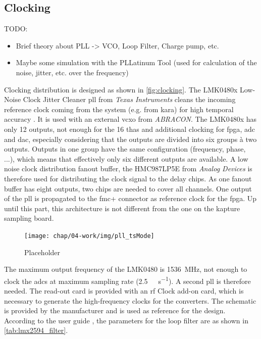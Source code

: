 \subsection{Clocking}
TODO:
\begin{itemize}
	\item Brief theory about PLL -> VCO, Loop Filter, Charge pump, etc.
	\item Maybe some simulation with the PLLatinum Tool (used for calculation of the noise, jitter, etc. over the frequency)
\end{itemize}
Clocking distribution is designed as shown in \autoref{fig:clocking}. The LMK0480x Low-Noise Clock Jitter Cleaner \gls{pll} from \textit{Texas Instruments} cleans the incoming reference clock coming from the system (e.g. from \gls{kara}) for high temporal accuracy \cite{caselle2013}. It is used with an external \gls{vcxo} from \textit{ABRACON}. The LMK0480x has only 12 outputs, not enough for the 16 \glspl{tha} and additional clocking for \gls{fpga}, \gls{adc} and \gls{dac}, especially considering that the outputs are divided into six groups à two outputs. Outputs in one group have the same configuration (frequency, phase, ...), which means that effectively only six different outputs are available. A low noise clock distribution fanout buffer, the HMC987LP5E from \textit{Analog Devices} is therefore used for distributing the clock signal to the delay chips. As one fanout buffer has eight outputs, two chips are needed to cover all channels. One output of the \gls{pll} is propagated to the \gls{fmc}+ connector as reference clock for the \gls{fpga}. Up until this part, this architecture is not different from the one on the \gls{kapture} sampling board. 

\begin{figure}[tbh]
	\centering
	\texttt{[image: chap/04-work/img/pll\_tsMode]}
	\caption{Placeholder}
	\label{fig:clocking}
\end{figure}

The maximum output frequency of the LMK0480 is \SI{1536}{\mega \hertz}, not enough to clock the \glspl{adc} at maximum sampling rate (\SI{2.5}{\giga \sample \per \second}). A second \gls{pll} is therefore needed. The read-out card is provided with an \gls{rf} Clock add-on card, which is necessary to generate the high-frequency clocks for the converters. The schematic is provided by the manufacturer and is used as reference for the design. According to the user guide \cite{xilCLK104}, the parameters for the loop filter are as shown in \autoref{tab:lmx2594_filter}.

